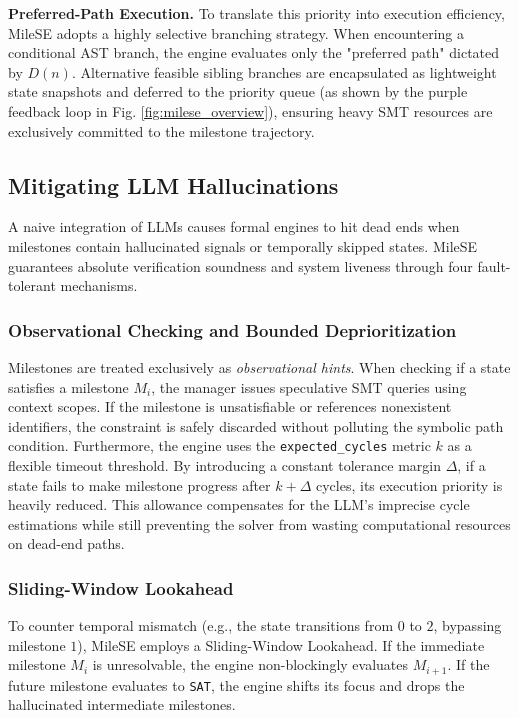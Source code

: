 \documentclass[conference]{IEEEtran}
\begin{document}
\textbf{Preferred-Path Execution.} To translate this priority into execution efficiency, MileSE adopts a highly selective branching strategy. When encountering a conditional AST branch, the engine evaluates only the "preferred path" dictated by $D(n)$. Alternative feasible sibling branches are encapsulated as lightweight state snapshots and deferred to the priority queue (as shown by the purple feedback loop in Fig. \ref{fig:milese_overview}), ensuring heavy SMT resources are exclusively committed to the milestone trajectory.


\subsection{Mitigating LLM Hallucinations}
A naive integration of LLMs causes formal engines to hit dead ends when milestones contain hallucinated signals or temporally skipped states. MileSE guarantees absolute verification soundness and system liveness through four fault-tolerant mechanisms.

\subsubsection{Observational Checking and Bounded Deprioritization}
Milestones are treated exclusively as \textit{observational hints}. When checking if a state satisfies a milestone $M_i$, the manager issues speculative SMT queries using context scopes. If the milestone is unsatisfiable or references nonexistent identifiers, the constraint is safely discarded without polluting the symbolic path condition. Furthermore, the engine uses the \texttt{expected\_cycles} metric $k$ as a flexible timeout threshold. By introducing a constant tolerance margin $\Delta$, if a state fails to make milestone progress after $k + \Delta$ cycles, its execution priority is heavily reduced. This allowance compensates for the LLM's imprecise cycle estimations while still preventing the solver from wasting computational resources on dead-end paths.

\subsubsection{Sliding-Window Lookahead}
To counter temporal mismatch (e.g., the state transitions from $0$ to $2$, bypassing milestone $1$), MileSE employs a Sliding-Window Lookahead. If the immediate milestone $M_{i}$ is unresolvable, the engine non-blockingly evaluates $M_{i+1}$. If the future milestone evaluates to \texttt{SAT}, the engine shifts its focus and drops the hallucinated intermediate milestones.
\end{document}
